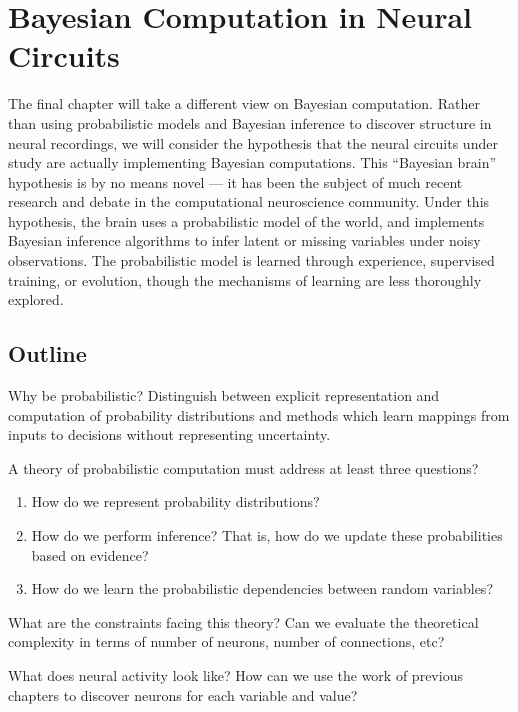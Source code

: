 \chapter{Bayesian Computation in Neural Circuits}

The final chapter will take a different view on Bayesian computation.
Rather than using probabilistic models and Bayesian inference to 
discover structure in neural recordings, we will consider the 
hypothesis that the neural circuits under study are actually 
implementing Bayesian computations. This ``Bayesian brain'' hypothesis 
is by no means novel --- it has been the subject of much recent 
research and debate in the computational neuroscience community. 
Under this hypothesis, the brain uses a probabilistic model 
of the world, and implements Bayesian inference algorithms to 
infer latent or missing variables under noisy observations. 
The probabilistic model is learned through experience, supervised 
training, or evolution, though the mechanisms of learning are 
less thoroughly explored. 

\clearpage
\section{Outline}
Why be probabilistic? Distinguish between explicit representation and
computation of probability distributions and methods which learn
mappings from inputs to decisions without representing uncertainty. 

A theory of probabilistic computation must address at least three questions?
\begin{enumerate}
\item How do we represent probability distributions?
\item How do we perform inference? That is, how do we update these
  probabilities based on evidence?
\item How do we learn the probabilistic dependencies between random variables?
\end{enumerate}


What are the constraints facing this theory? Can we evaluate the
theoretical complexity in terms of number of neurons, number of
connections, etc?

What does neural activity look like? How can we use the work of
previous chapters to discover neurons for each variable and value?

